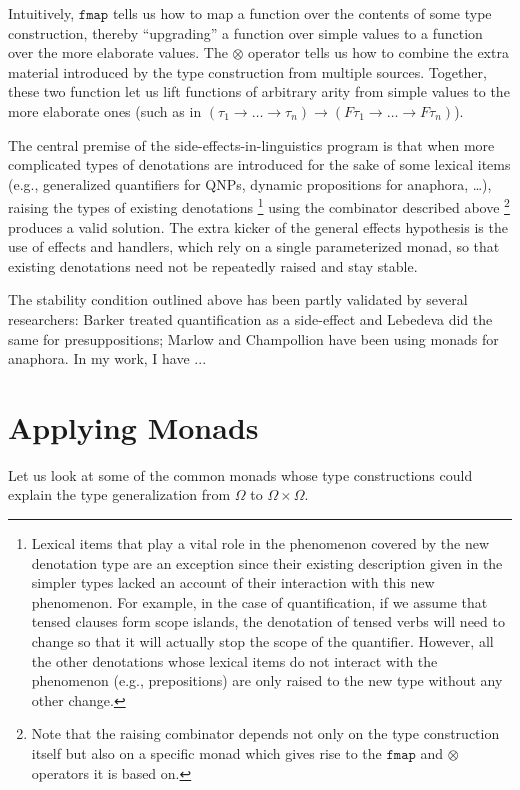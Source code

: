 \documentclass[a4paper,11pt,DIV=12]{scrartcl}
\begin{document}
Intuitively, $\texttt{fmap}$ tells us how to map a function over the
contents of some type construction, thereby ``upgrading'' a function over
simple values to a function over the more elaborate values. The $\otimes$
operator tells us how to combine the extra material introduced by the type
construction from multiple sources. Together, these two function let us
lift functions of arbitrary arity from simple values to the more elaborate
ones (such as in $(\tau_1 \to \ldots \to \tau_n) \to (F \tau_1 \to \ldots
\to F \tau_n)$).

The central premise of the side-effects-in-linguistics program is that when
more complicated types of denotations are introduced for the sake of some
lexical items (e.g., generalized quantifiers for QNPs, dynamic propositions
for anaphora, \ldots), raising the types of existing
denotations \footnote{Lexical items that play a vital role in the
  phenomenon covered by the new denotation type are an exception since
  their existing description given in the simpler types lacked an account
  of their interaction with this new phenomenon. For example, in the case
  of quantification, if we assume that tensed clauses form scope islands,
  the denotation of tensed verbs will need to change so that it will
  actually stop the scope of the quantifier. However, all the other
  denotations whose lexical items do not interact with the phenomenon
  (e.g., prepositions) are only raised to the new type without any other
  change.} using the combinator described above \footnote{Note that the
  raising combinator depends not only on the type construction itself but
  also on a specific monad which gives rise to the $\texttt{fmap}$ and
  $\otimes$ operators it is based on.} produces a valid solution. The extra
kicker of the general effects hypothesis is the use of effects and
handlers, which rely on a single parameterized monad, so that existing
denotations need not be repeatedly raised and stay stable.

The stability condition outlined above has been partly validated by several
researchers: Barker treated quantification as a side-effect and Lebedeva
did the same for presuppositions; Marlow and Champollion have been using
monads for anaphora. In my work, I have ...

\section{Applying Monads}

Let us look at some of the common monads whose type constructions could
explain the type generalization from $\Omega$ to $\Omega \times \Omega$.
\end{document}
